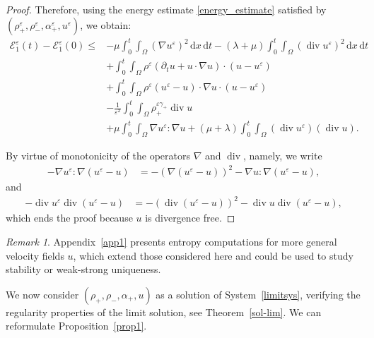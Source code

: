 \documentclass[11pt, twoside, a4paper]{article}
\theoremstyle{plain}
\theoremstyle{remark}
\newtheorem{remark}[theorem]{Remark}
\numberwithin{equation}{section}
\def\EE{{\mathcal E}}
\newcommand{\dd}{\,\mathrm{d}}
\renewcommand{\div}{\operatorname{div}}
\renewcommand{\leq}{\leqslant}\renewcommand{\le}{\leqslant}
\renewcommand{\epsilon}{\varepsilon}
\newcommand{\eps}{\varepsilon}
\begin{document}
\begin{proof}
Therefore, using the energy estimate \eqref{energy_estimate} satisfied by $(\rho_+^{\epsilon}, \rho_-^{\epsilon}, \alpha_+^{\epsilon},u^{\epsilon}) $, we obtain:
\begin{align*}
 \EE_1^\eps(t) - \EE_1^\eps(0) \leq& -\mu \int_0^t \!\!\!\int_{\Omega}\left( \nabla u^\eps \right)^2 \dd x \dd t - \left(\lambda + \mu\right) \int_0^t \!\!\!\int_{\Omega} (\div u^\eps )^2 \dd x \dd t\\
 &+\int_0^t\!\!\! \int_{\Omega} \rho^\eps (\partial_t u + u \cdot \nabla u)\cdot (u-u^{\epsilon}) \\
 &+ \int_0^t \!\!\! \int_{\Omega} \rho^\eps (u^{\epsilon}-u)\cdot \nabla u \cdot (u-u^{\epsilon})\\
 & - \frac{1}{\epsilon^2}\int_0^t\!\!\! \int_{\Omega} \rho_{+}^{\varepsilon \gamma_+}\div u \\
 &+\mu \int_0^t \!\!\! \int_{\Omega} \nabla u^{\varepsilon} : \nabla u + (\mu+\lambda) \int_0^t \!\!\! \int_{\Omega} \left(\operatorname{div} u^{\varepsilon}\right)(\operatorname{div} u).
\end{align*}

By virtue of monotonicity of the operators $\nabla$ and $\div$, namely, we write
\begin{align*}
 - \nabla u^{\varepsilon} : \nabla (u^\eps-u) &= - \left(\nabla (u^\eps - u) \right)^2 - \nabla u : \nabla(u^\eps - u),
\end{align*}
and
\begin{align*}
 - \div u^\eps \div(u^\eps-u) &= - \left( \div(u^\eps - u) \right)^2 - \div u \div(u^\eps - u),
\end{align*}
which ends the proof because $u$ is divergence free.
\end{proof}


\begin{remark}
Appendix~\ref{app1} presents entropy computations for more general velocity fields $u$, which extend those considered here and could be used to study stability or weak-strong uniqueness.
\end{remark}





We now consider $(\rho_+,\rho_-,\alpha_+,u)$ as a solution of System~\eqref{limitsys}, verifying the regularity properties of the limit solution, see Theorem~\ref{sol-lim}. We can reformulate Proposition~\ref{prop1}.
\end{document}

